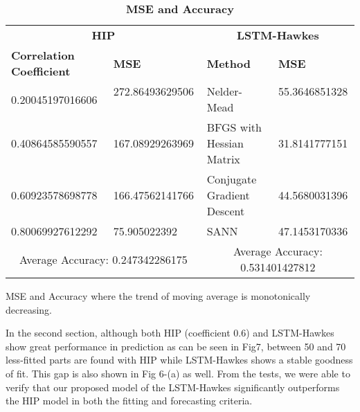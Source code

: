 \documentclass[10pt,letterpaper]{article}
\newlength\savedwidth
\newcommand\thickhline{\noalign{\global\savedwidth\arrayrulewidth\global\arrayrulewidth 2pt}%
\hline
\noalign{\global\arrayrulewidth\savedwidth}}
\begin{document}
\begin{table}[H]
\begin{adjustwidth}{-2.25in}{0in} %
\caption{{\bf MSE and Accuracy}}
\begin{tabular}{|l|l|l|l|}
\hline
\multicolumn{2}{|c|}{\bf HIP} &
\multicolumn{2}{c|}{\bf LSTM-Hawkes}\\ \thickhline
\textbf{Correlation Coefficient} &
\textbf{MSE} & 
\textbf{Method} & 
\textbf{MSE}\\ \hline

0.20045197016606 \quad \quad \quad \quad \quad & 
272.86493629506 \quad \quad \quad \ \ & 
Nelder-Mead & 
55.3646851328 \quad \quad \quad \ \\ \hline

0.40864585590557 & 
167.08929263969 & 
BFGS with Hessian Matrix & 
31.8141777151\\ \hline

0.60923578698778 & 
166.47562141766 & 
Conjugate Gradient Descent
\quad \quad \quad \quad \quad & 
44.5680031396\\ \hline

0.80069927612292 & 
75.905022392 & 
SANN & 
47.1453170336\\ \hline

\multicolumn{2}{|c|}{Average Accuracy: 0.247342286175} &
\multicolumn{2}{c|}{Average Accuracy: 0.531401427812}\\ \hline

\end{tabular}
\begin{flushleft} MSE and Accuracy where the trend of moving average is monotonically decreasing.
\end{flushleft}
\label{table2}
\end{adjustwidth}
\end{table}
In the second section, although both HIP (coefficient 0.6) and LSTM-Hawkes show great performance in prediction as can be seen in Fig7, between 50 and 70 less-fitted parts are found with HIP while LSTM-Hawkes shows a stable goodness of fit. This gap is also shown in Fig 6-(a) as well. From the tests, we were able to verify that our proposed model of the LSTM-Hawkes significantly outperforms the HIP model in both the fitting and forecasting criteria. \\
\end{document}
